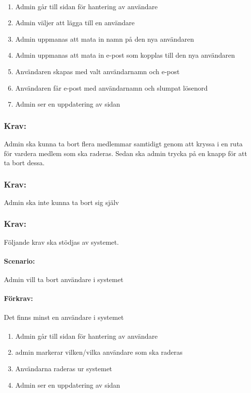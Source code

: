 \documentclass[paper=a4, fontsize=11pt,twoside]{article}
\begin{document}
\paragraph{}
\begin{enumerate}
\item Admin går till sidan för hantering av användare
\item Admin väljer att lägga till en användare
\item Admin uppmanas att mata in namn på den nya användaren
\item Admin uppmanas att mata in e-post som kopplas till den nya användaren
\item Användaren skapas med valt användarnamn och e-post
\item Användaren får e-post med användarnamn och slumpat lösenord
\item Admin ser en uppdatering av sidan
\end{enumerate}

\subsubsection{Krav:} Admin ska kunna ta bort flera medlemmar samtidigt genom att kryssa i en ruta för vardera medlem som ska raderas. Sedan ska admin trycka på en knapp för att ta bort dessa.
\subsubsection{Krav:} Admin ska inte kunna ta bort sig själv

\subsubsection{Krav:} Följande krav ska stödjas av systemet. 
\paragraph{Scenario:}
Admin vill ta bort användare i systemet
\paragraph{Förkrav:}
Det finns minst en användare i systemet
\paragraph{}
\begin{enumerate}
\item Admin går till sidan för hantering av användare
\item admin markerar vilken/vilka användare som ska raderas
\item Användarna raderas ur systemet
\item Admin ser en uppdatering av sidan
\end{enumerate}
\end{document}
